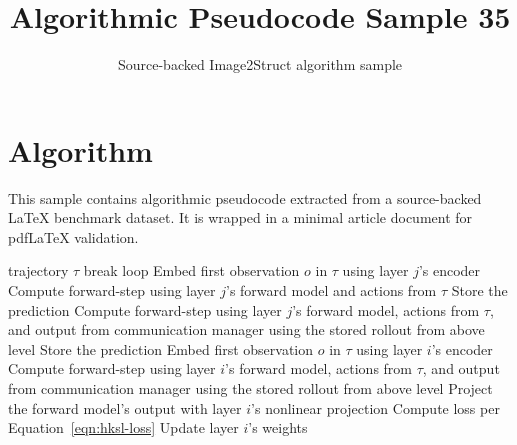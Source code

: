 \documentclass[11pt]{article}
\title{Algorithmic Pseudocode Sample 35}
\author{Source-backed Image2Struct algorithm sample}
\date{}
\begin{document}
\maketitle
\section{Algorithm}
This sample contains algorithmic pseudocode extracted from a source-backed LaTeX benchmark dataset. It is wrapped in a minimal article document for pdfLaTeX validation.

\begin{algorithm}[htbp]
\caption{Source-backed algorithmic procedure}
\begin{algorithmic}[1]
\Require trajectory $\tau$
\State break loop
\EndIf
\State Embed first observation $o$ in $\tau$ using layer $j$'s encoder
\State Compute forward-step using layer $j$'s forward model and actions from $\tau$
\State Store the prediction
\EndFor
{}
\State Compute forward-step using layer $j$'s forward model, actions from $\tau$, and output from communication manager using the stored rollout from above level
\State Store the prediction
\EndFor
\EndIf
\EndFor
\State Embed first observation $o$ in $\tau$ using layer $i$'s encoder
\State Compute forward-step using layer $i$'s forward model, actions from $\tau$, and output from communication manager using the stored rollout from above level
\State Project the forward model's output with layer $i$'s nonlinear projection
\State Compute loss per Equation~\ref{eqn:hksl-loss}
\EndFor
\State Update layer $i$'s weights
\EndFor
\end{algorithmic}
\end{algorithm}
\end{document}
